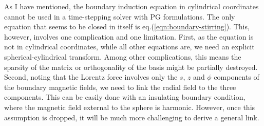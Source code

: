As I have mentioned, the boundary induction equation in cylindrical coordinates cannot be used in a time-stepping solver with PG formulations. The only equation that seems to be closed in itself is eq.(\ref{eqn:boundary-stirring}). This, however, involves one complication and one limitation. First, as the equation is not in cylindrical coordinates, while all other equations are, we need an explicit spherical-cylindrical transform. Among other complications, this means the sparsity of the matrix or orthogonality of the basis might be partially destroyed. Second, noting that the Lorentz force involves only the $s$, $z$ and $\phi$ components of the boundary magnetic fields, we need to link the radial field to the three components. This can be easily done with an insulating boundary condition, where the magnetic field external to the sphere is harmonic. However, once this assumption is dropped, it will be much more challenging to derive a general link.
